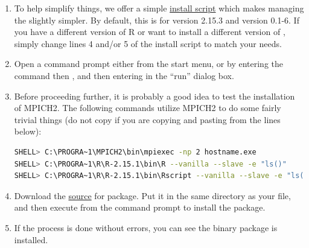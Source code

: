 \begin{enumerate}
  \item To help simplify things, we offer a simple \href{https://github.com/wrathematics/installation-instructions/raw/master/windows/build_pbdMPI.bat}{install script} which makes managing the  slightly simpler.  By default, this is for  version 2.15.3 and  version 0.1-6.  If you have a different version of R or want to install a different version of , simply change lines 4 and/or 5 of the install script to match your needs.
  \item Open a command prompt either from the start menu, or by entering the command  then , and then entering  in the ``run'' dialog box.
  \item Before proceeding further, it is probably a good idea to test the installation of MPICH2.  The following commands utilize MPICH2 to do some fairly trivial things (do not copy  if you are copying and pasting from the lines below):
\begin{lstlisting}[language=sh]
SHELL> C:\PROGRA~1\MPICH2\bin\mpiexec -np 2 hostname.exe
SHELL> C:\PROGRA~1\R\R-2.15.1\bin\R --vanilla --slave -e "ls()"
SHELL> C:\PROGRA~1\R\R-2.15.1\bin\Rscript --vanilla --slave -e "ls()"
\end{lstlisting}
  \item Download the \href{http://cran.r-project.org/src/contrib/pbdMPI_0.1-6.tar.gz}{source} for \href{http://cran.r-project.org/web/packages/pbdMPI/index.html}{} package.  Put it in the same directory as your  file, and then execute  from the command prompt to install the package.
  \item If the process is done without errors, you can see the binary package is installed. 
\end{enumerate}
